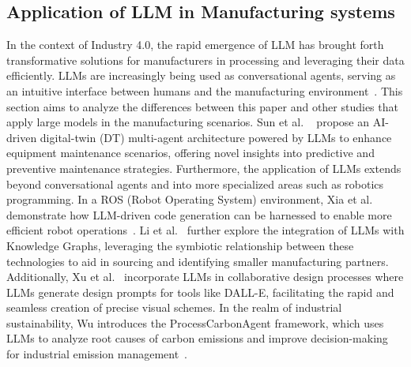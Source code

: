 \documentclass[preprint,12pt]{elsarticle}
\begin{document}
\subsection{Application of LLM in Manufacturing systems}
In the context of Industry 4.0, the rapid emergence of LLM has brought forth transformative solutions for manufacturers in processing and leveraging their data efficiently. 
LLMs are increasingly being used as conversational agents, serving as an intuitive interface between humans and the manufacturing environment~\cite{colabianchi2023human}. 
This section aims to analyze the differences between this paper and other studies that apply large models in the manufacturing scenarios.
Sun et al. ~\cite{sun2024empowering} propose an AI-driven digital-twin (DT) multi-agent architecture powered by LLMs to enhance equipment maintenance scenarios, offering novel insights into predictive and preventive maintenance strategies. 
Furthermore, the application of LLMs extends beyond conversational agents and into more specialized areas such as robotics programming. In a ROS (Robot Operating System) environment, Xia et al. demonstrate how LLM-driven code generation can be harnessed to enable more efficient robot operations~\cite{XIA2024102728}. 
Li et al.~\cite{li2024building} further explore the integration of LLMs with Knowledge Graphs, leveraging the symbiotic relationship between these technologies to aid in sourcing and identifying smaller manufacturing partners. 
Additionally, Xu et al.~\cite{xu2024llm} incorporate LLMs in collaborative design processes where LLMs generate design prompts for tools like DALL-E, facilitating the rapid and seamless creation of precise visual schemes.
In the realm of industrial sustainability, Wu introduces the ProcessCarbonAgent framework, which uses LLMs to analyze root causes of carbon emissions and improve decision-making for industrial emission management~\cite{wu2024processcarbonagent}. 
\end{document}
